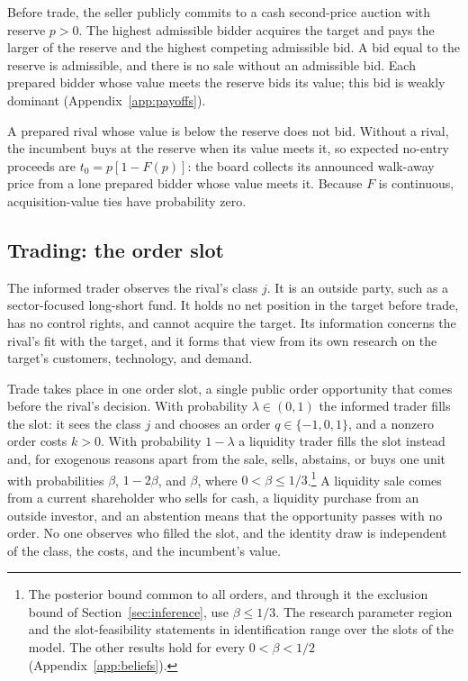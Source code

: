 Before trade, the seller publicly commits to a cash second-price auction with reserve \(p>0\). The highest
admissible bidder acquires the target and pays the larger of the reserve and the highest competing admissible
bid. A bid equal to the reserve is admissible, and there is no sale without an admissible bid. Each prepared
bidder whose value meets the reserve bids its value; this bid is weakly dominant
(Appendix~\ref{app:payoffs}).

A prepared rival whose value is below the reserve does not bid. Without a rival, the incumbent
buys at the reserve when its value meets it, so expected no-entry proceeds are \(t_0=p[1-F(p)]\): the board
collects its announced walk-away price from a lone prepared bidder whose value meets it. Because \(F\) is
continuous, acquisition-value ties have probability zero.

\subsection{Trading: the order slot}\label{sec:slot}

The informed trader observes the rival's class \(j\). It is an outside party, such as a
sector-focused long-short fund. It holds no net position in the target before trade, has no control rights,
and cannot acquire the target. Its information concerns the rival's fit with the target, and it forms
that view from its own research on the target's customers, technology, and demand.

Trade takes place in one order slot, a single public order opportunity that comes before the rival's
decision. With probability \(\lambda\in(0,1)\) the informed trader fills the slot: it sees the class
\(j\) and chooses an order \(q\in\{-1,0,1\}\), and a nonzero order costs \(k>0\). With probability
\(1-\lambda\) a liquidity trader fills the slot instead and, for exogenous reasons apart from the sale,
sells, abstains, or buys one unit with probabilities \(\beta\), \(1-2\beta\), and \(\beta\), where
\(0<\beta\le1/3\).\footnote{The posterior bound common to all orders, and through it the exclusion bound of
Section~\ref{sec:inference}, use \(\beta\le1/3\). The research parameter region and the slot-feasibility
statements in identification range over the slots of the model. The other results hold for every
\(0<\beta<1/2\) (Appendix~\ref{app:beliefs}).} A liquidity sale comes from a current shareholder who
sells for cash, a liquidity purchase from an outside investor, and an abstention means that the opportunity
passes with no order. No one observes who filled the slot, and the identity draw is independent of the class,
the costs, and the incumbent's value.

